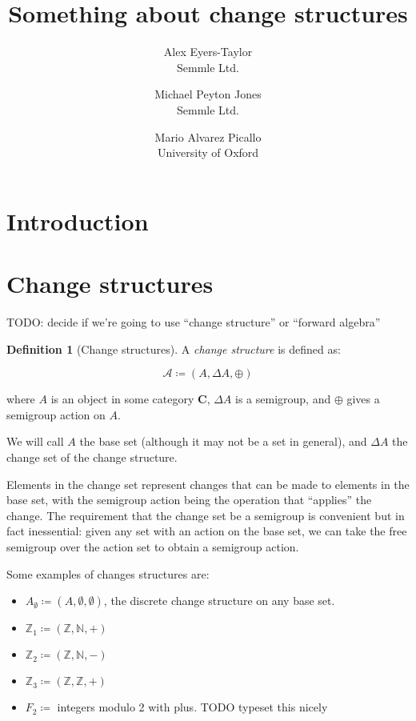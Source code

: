 \documentclass[english]{article}
\theoremstyle{plain}
\theoremstyle{definition}
\theoremstyle{remark}
\theoremstyle{remark}
\theoremstyle{remark}
\theoremstyle{definition}
\newtheorem{defn}{Definition}
\newcommand{\defeq}{\coloneqq}
\newcommand{\cat}[1]{\mathbf{#1}}
\newcommand{\cplus}{\oplus}
\newcommand{\cstruct}[3]{(#1,#2,#3)}
\newcommand{\changes}[1]{\Delta #1}
\newcommand{\discrete}{\emptyset}
\begin{document}
\title{Something about change structures}

\author{
  Alex Eyers-Taylor\\
  Semmle Ltd.
  \and
  Michael Peyton Jones\\
  Semmle Ltd.
  \and
  Mario Alvarez Picallo\\
  University of Oxford
}

\maketitle

\section{Introduction}

\section{Change structures}

TODO: decide if we're going to use ``change structure'' or ``forward algebra''
\begin{defn}[Change structures]
  A \textit{change structure} is defined as:

  $$\mathcal{A} \defeq \cstruct{A}{\changes{A}}{\cplus}$$

  where $A$ is an object in some category $\cat{C}$, $\changes{A}$ is a semigroup, and $\cplus$ gives a semigroup action on $A$.

  We will call $A$ the base set (although it may not be a set in general), and $\changes{A}$ the change set of the change structure.
\end{defn}

Elements in the change set represent changes that can be made to elements in the
base set, with the semigroup action being the operation that ``applies'' the
change. The requirement that the change set be a semigroup is convenient but in
fact inessential: given any set with an action on the base set, we can take the
free semigroup over the action set to obtain a semigroup action.

Some examples of changes structures are:
\begin{itemize}
  \item $A_\discrete \defeq \cstruct{A}{\emptyset}{\emptyset}$, the discrete
    change structure on any base set.
  \item $\mathbb{Z}_1 \defeq \cstruct{\mathbb{Z}}{\mathbb{N}}{+}$
  \item $\mathbb{Z}_2 \defeq \cstruct{\mathbb{Z}}{\mathbb{N}}{-}$
  \item $\mathbb{Z}_3 \defeq \cstruct{\mathbb{Z}}{\mathbb{Z}}{+}$
  \item $F_2 \defeq$ integers modulo 2 with plus. TODO typeset this nicely
\end{itemize}
\end{document}
